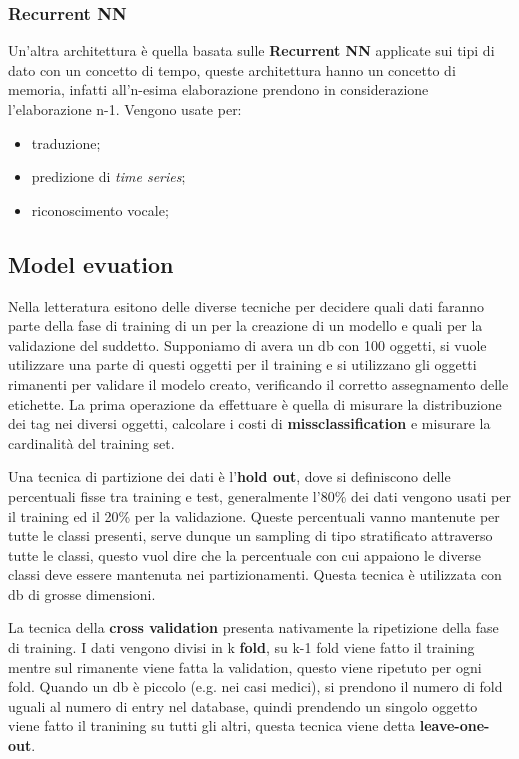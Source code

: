 \documentclass[12pt]{article}
\begin{document}
\subsubsection{Recurrent NN}
Un'altra architettura \`e quella basata sulle \textbf{Recurrent NN} applicate sui tipi di dato con un concetto di tempo, queste architettura hanno un concetto di memoria, infatti all'n-esima elaborazione prendono in considerazione l'elaborazione n-1. Vengono usate per:
\begin{itemize}
    \item traduzione;
    \item predizione di \emph{time series};
    \item riconoscimento vocale;
\end{itemize}


\subsection{Model evuation}
Nella letteratura esitono delle diverse tecniche per decidere quali dati faranno parte della fase di training di un per la creazione di un modello e quali per la validazione del suddetto. Supponiamo di avera un db con 100 oggetti, si vuole utilizzare una parte di questi oggetti per il training e si utilizzano gli oggetti rimanenti per validare il modelo creato, verificando il corretto assegnamento delle etichette. La prima operazione da effettuare \`e quella di misurare la distribuzione dei tag nei diversi oggetti, calcolare i costi di \textbf{missclassification} e misurare la cardinalit\`a del training set.

Una tecnica di partizione dei dati \`e l'\textbf{hold out}, dove si definiscono delle percentuali fisse tra training e test, generalmente l'80\% dei dati vengono usati per il training ed il 20\% per la validazione. Queste percentuali vanno mantenute per tutte le classi presenti, serve dunque un sampling di tipo stratificato attraverso tutte le classi, questo vuol dire che la percentuale con cui appaiono le diverse classi deve essere mantenuta nei partizionamenti. Questa tecnica \`e utilizzata con db di grosse dimensioni.

La tecnica della \textbf{cross validation} presenta nativamente la ripetizione della fase di training. I dati vengono divisi in k \textbf{fold}, su k-1 fold viene fatto il training mentre sul rimanente viene fatta la validation, questo viene ripetuto per ogni fold. Quando un db \`e piccolo (e.g. nei casi medici), si prendono il numero di fold uguali al numero di entry nel database, quindi prendendo un singolo oggetto viene fatto il tranining su tutti gli altri, questa tecnica viene detta \textbf{leave-one-out}.
\end{document}
